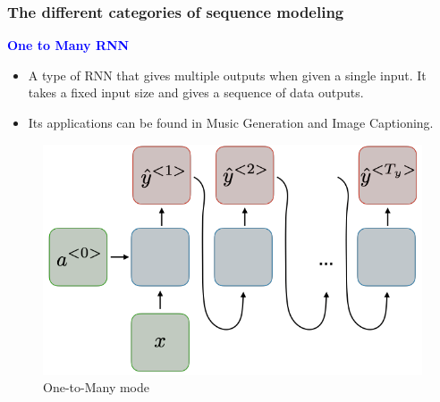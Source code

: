 \documentclass[11pt,]{beamer}
\begin{document}
\begin{frame}
	\frametitle{The different categories of sequence modeling}
	\large{\textcolor{blue}{\textbf{One to Many RNN}}}
	\begin{itemize}
		\item A type of RNN that gives multiple outputs when given a single input. It takes a fixed input size and gives a sequence of data outputs.
		\item Its applications can be found in Music Generation and Image Captioning.
	\end{itemize}
	\begin{figure}[h]
		\centering
		\includegraphics[scale=0.3]{Images/rnn-one-to-many-ltr.png}
		\caption{One-to-Many mode}
	\end{figure}
\end{frame}
\end{document}
